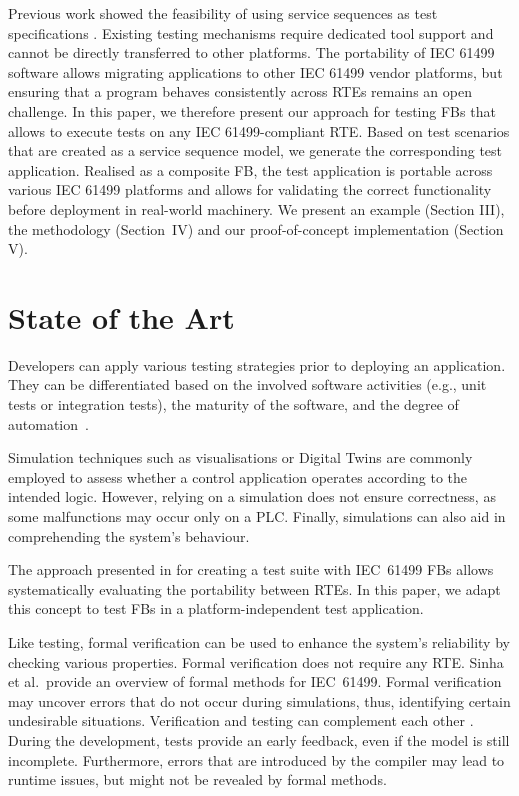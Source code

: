 \documentclass[conference]{IEEEtran}
\begin{document}
Previous work showed the feasibility of using service sequences as test specifications \cite{wiesmayr2021,hametner2014}. 
Existing testing mechanisms require dedicated tool support and cannot be directly transferred to other platforms. The portability of IEC 61499 software allows migrating applications to other IEC 61499 vendor platforms, but ensuring that a program behaves consistently across RTEs remains an open challenge. 
In this paper, we therefore present our approach for testing FBs that allows to execute tests on any IEC 61499-compliant RTE. Based on test scenarios that are created as a service sequence model, we generate the corresponding test application. %
Realised as a composite FB, the test application is portable across various IEC 61499 platforms and allows for validating the correct functionality before deployment in real-world machinery. We present an example (Section III), the methodology (Section~IV) and our proof-of-concept implementation (Section V).

\section{State of the Art}
Developers can apply various testing strategies prior to deploying an application. They can be differentiated based on the involved software activities (e.g., unit tests or integration tests), the maturity of the software, and the degree of automation~\cite{softwareTesting}. 

Simulation techniques such as visualisations or Digital Twins are commonly employed to assess whether a control application operates according to the intended logic. However, relying on a simulation does not ensure correctness, as some malfunctions may occur only on a PLC. Finally, simulations can also aid in comprehending the system's behaviour.

The approach presented in \cite{Testing_Midhun} for creating a test suite with IEC~61499 FBs allows systematically evaluating the portability between RTEs. In this paper, we adapt this concept to test FBs in a platform-independent test application. 

Like testing, formal verification can be used to enhance the system's reliability by checking various properties. Formal verification does not require any RTE. Sinha et al.\,\cite{Sinha.2019} provide an overview of formal methods for IEC~61499. Formal verification may uncover errors that do not occur during simulations, thus, identifying certain undesirable situations. 
Verification and testing can complement each other \cite{Hussain.2006}. During the development, tests provide an early feedback, even if the model is still incomplete. Furthermore, errors that are introduced by the compiler may lead to runtime issues, but might not be revealed by formal methods. 
\end{document}
